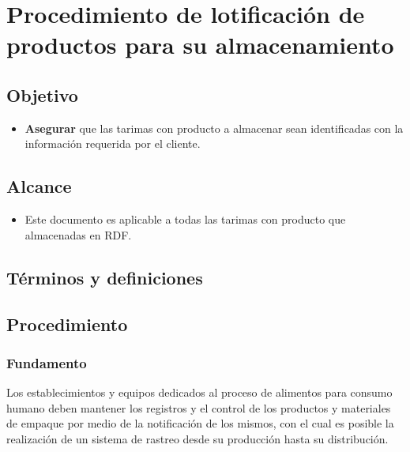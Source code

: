 \renewcommand{\MayorVer}{2}
\renewcommand{\MenorVer}{1}
\renewcommand{\Codigo}{PSA-2-PRO} 
\renewcommand{\FechaPub}{2023--01}
\renewcommand{\Titulo}{Procedimiento de lotificación de productos para su almacenamiento}

\section{\Titulo}


\subsection{Objetivo}

\begin{itemize}
	\item \textbf{Asegurar} que las tarimas con producto a almacenar sean identificadas con la información requerida por el cliente.
\end{itemize}

\subsection{Alcance}

\begin{itemize}
	\item Este documento es aplicable a todas las tarimas con producto que almacenadas en RDF.
\end{itemize}

\subsection{Términos y definiciones}

\subsection{Procedimiento}

\subsubsection{Fundamento}

Los establecimientos y equipos dedicados al proceso de alimentos para consumo humano deben mantener los registros y el control de los productos y materiales de empaque por medio de la notificación de los mismos, con el cual es posible la realización de un sistema de rastreo desde su producción hasta su distribución.


